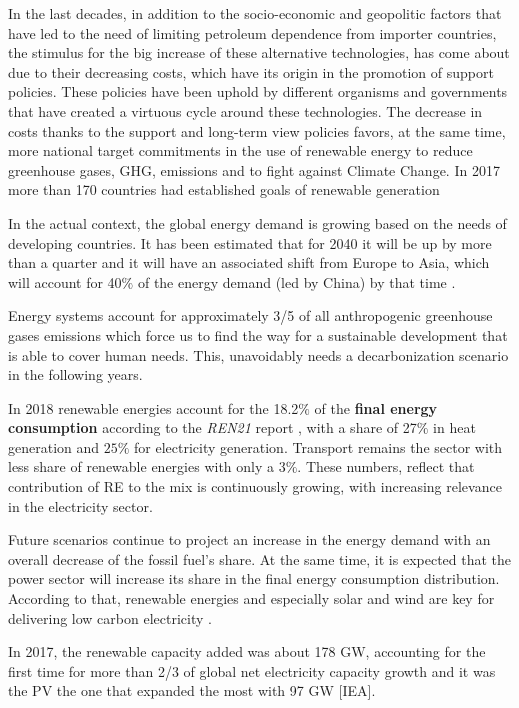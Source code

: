 In the last decades, in addition to the socio-economic and geopolitic factors that have led to the need of limiting petroleum dependence from importer countries, the stimulus for the big increase of these alternative technologies, has come about due to their decreasing costs, which have its origin in the promotion of support policies. These policies have been uphold by different organisms and governments that have created a virtuous cycle around these technologies. The decrease in costs thanks to the support and long-term view policies favors, at the same time, more national target commitments in the use of renewable energy to reduce greenhouse gases, GHG, emissions and to fight against Climate Change. In 2017 more than 170 countries had established goals of renewable generation \cite*{IRENA2017}
 
In the actual context, the global energy demand is growing based on the needs of developing countries. It has been estimated that for 2040 it will be up by more than a quarter and it will have an associated shift from Europe to Asia, which will account for 40$\%$ of the energy demand (led by China) by that time \cite*{WEO2018}.

Energy systems account for approximately 3/5 of all anthropogenic greenhouse gases emissions \cite*{WEO2018} which force us to find the way for a sustainable development that is able to cover human needs. This, unavoidably needs a decarbonization scenario in the following years.  

In 2018 renewable energies account for the 18.2$\%$ of the \textbf{final energy consumption} according to the \textit{REN21} report \cite*{REN21}, with a share of 27$\%$ in heat generation and $25\%$ for electricity generation. Transport remains the sector with less share of renewable energies with only a $3\%$. These numbers, reflect that contribution of RE to the mix is continuously growing, with increasing relevance in the electricity sector.

Future scenarios continue to project an increase in the energy demand with an overall decrease of the fossil fuel's share. At the same time, it is expected that the power sector will increase its share in the final energy consumption distribution. According to that, renewable energies and especially solar and wind are key for delivering low carbon electricity \cite*{Troccoli2018}.

In 2017, the renewable capacity added was about 178 GW, accounting for the first time for more than 2/3 of global net electricity capacity growth and it was the PV the one that expanded the most with 97 GW [IEA].

